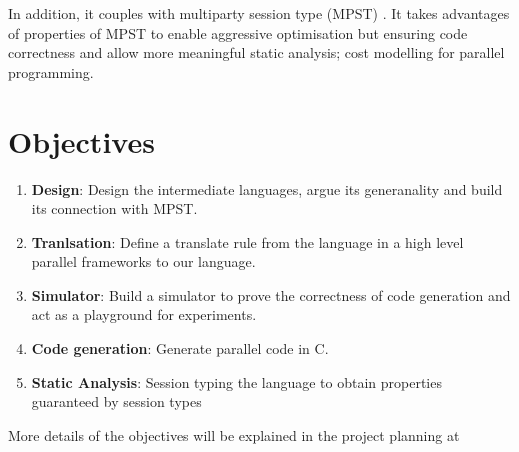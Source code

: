 In addition, it couples with multiparty session type (MPST) \cite{coppoGentleIntroductionMultiparty2015}. It takes advantages of properties of MPST to enable aggressive optimisation but ensuring code correctness and allow more meaningful static analysis; \eg cost modelling for parallel programming. %

\section{Objectives}
\begin{enumerate}
\item \textbf{Design}: Design the intermediate languages, argue its generanality and build its connection with MPST. 
\item \textbf{Tranlsation}: Define a translate rule from the language in a high level parallel frameworks to our language. 
\item \textbf{Simulator}: Build a simulator to prove the correctness of code generation and act as a playground for experiments.
\item \textbf{Code generation}: Generate parallel code in C.
\item \textbf{Static Analysis}: Session typing the language to obtain properties guaranteed by session types%
\end{enumerate}
More details of the objectives will be explained in the project planning at 